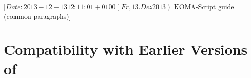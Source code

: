 %
%
%
%
%
%
%
%
% 
%
%
%
%

                 [$Date: 2013-12-13 12:11:01 +0100 (Fr, 13. Dez 2013) $
                  KOMA-Script guide (common paragraphs)]


\makeatletter
{}%
%
%
%
\makeatother


\section{Compatibility with Earlier Versions of \KOMAScript}
\label{sec:\csname label@base\endcsname.compatibilityOptions}
\ifshortversion\IgnoreThisfalse{}\fi%
\ifIgnoreThis %

